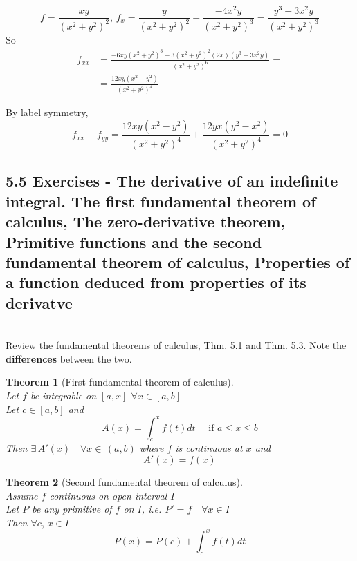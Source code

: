 \documentclass[twoside]{amsart}
\theoremstyle{plain}
\newtheorem{theorem}{Theorem}
\theoremstyle{definition}
\newcommand{\exercisehead}[1]
  {\smallskip
   \noindent{\small\bf Exercise #1.}}
\begin{document}
\exercisehead{10} 
\[
f = \frac{xy }{(x^2 + y^2 )^2 }, \, f_x = \frac{ y}{ (x^2 + y^2 )^2 } + \frac{ -4 x^2 y }{ (x^2 + y^2)^3 } = \frac{ y^3 - 3x^2 y }{ (x^2 +y^2 )^3 } 
\]
So 
\[
\begin{aligned}
  f_{xx} & = \frac{ -6xy (x^2 + y^2 )^3  - 3 (x^2 + y^2 )^2 (2x) (y^3 -3x^2 y ) }{ (x^2 + y^2 )^6 } = \\
  & = \frac{ 12 xy (x^2 -y^2 )}{ (x^2 + y^2 )^4 } 
\end{aligned}
\]

By label symmetry, 
\[
f_{xx} + f_{yy} = \frac{ 12 xy (x^2 - y^2 )}{ (x^2 + y^2 )^4 } + \frac{ 12 yx (y^2 - x^2 )}{ (x^2 + y^2 )^4 } = 0 
\]

\subsection*{ 5.5 Exercises - The derivative of an indefinite integral.  The first fundamental theorem of calculus, The zero-derivative theorem, Primitive functions and the second fundamental theorem of calculus, Properties of a function deduced from properties of its derivatve }
\quad \\
Review the fundamental theorems of calculus, Thm. 5.1 and Thm. 5.3.  Note the \textbf{differences} between the two.  
\begin{theorem}[First fundamental theorem of calculus] \quad \\
Let $f$ be integrable on $[a,x]$ \quad $\forall x \in [a,b]$  \\
Let $c \in [a,b]$ and 
\begin{equation}
  A(x) = \int_c^x f(t) dt \quad \text{ if } a \leq x \leq b 
\end{equation}
Then $\exists \, A'(x) \quad \forall x \in \, (a,b)$ where $f$ is continuous at $x$ and 
\begin{equation}
  A'(x) = f(x)
\end{equation}
\end{theorem}

\begin{theorem}[Second fundamental theorem of calculus] \quad \\
Assume $f$ continuous on open interval $I$ \\
Let $P$ be any primitive of $f$ on $I$, i.e. $P' = f \quad  \forall x \in I$ \\
Then $\forall c, \, x \in I$
\begin{equation}
  P(x) = P(c) + \int_c^x f(t) dt 
\end{equation}
\end{theorem} 
\end{document}
